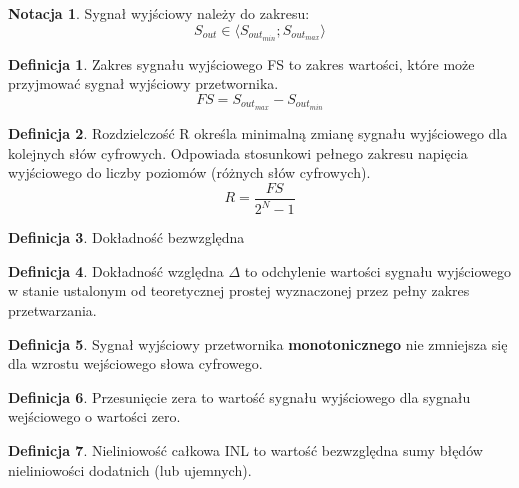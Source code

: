\documentclass[10pt,a4paper]{report}
\theoremstyle{definition}
\newtheorem{notation}{Notacja}[section]
\theoremstyle{definition}
\newtheorem{definition}{Definicja}[section]
\theoremstyle{definition}
\theoremstyle{definition}
\theoremstyle{definition}
\begin{document}
	\begin{notation}{Sygnał wyjściowy należy do zakresu:}
		$$
			S_{out} \in \langle S_{out_{min}} ;  S_{out_{max}} \rangle
		$$
	\end{notation}

	\begin{definition}{Zakres sygnału wyjściowego FS to zakres wartości, które może przyjmować sygnał wyjściowy przetwornika.}
		\begin{equation}
			FS = S_{out_{max}} - S_{out_{min}}
		\end{equation}
	\end{definition}

	\begin{definition}{Rozdzielczość R określa minimalną zmianę sygnału wyjściowego dla kolejnych słów cyfrowych. Odpowiada stosunkowi pełnego zakresu napięcia wyjściowego do liczby poziomów (różnych słów cyfrowych). }
		\begin{equation}
			R = \frac{FS}{2^{N}-1}		
		\end{equation}
	\end{definition}


	\begin{definition}{Dokładność bezwzględna}
		
	\end{definition}
	
	\begin{definition}{Dokładność względna $\Delta$ to odchylenie wartości sygnału wyjściowego w stanie ustalonym od teoretycznej prostej wyznaczonej przez pełny zakres przetwarzania. }
		
	\end{definition}
	
	\begin{definition}{Sygnał wyjściowy przetwornika \textbf{monotonicznego} nie zmniejsza się dla wzrostu wejściowego słowa cyfrowego. }
		
	\end{definition}


	\begin{definition}{Przesunięcie zera to wartość sygnału wyjściowego dla sygnału wejściowego o wartości zero. }
	
	\end{definition}


	\begin{definition}{Nieliniowość całkowa INL to wartość bezwzględna sumy błędów nieliniowości dodatnich (lub ujemnych).}
		
	\end{definition}
\end{document}
